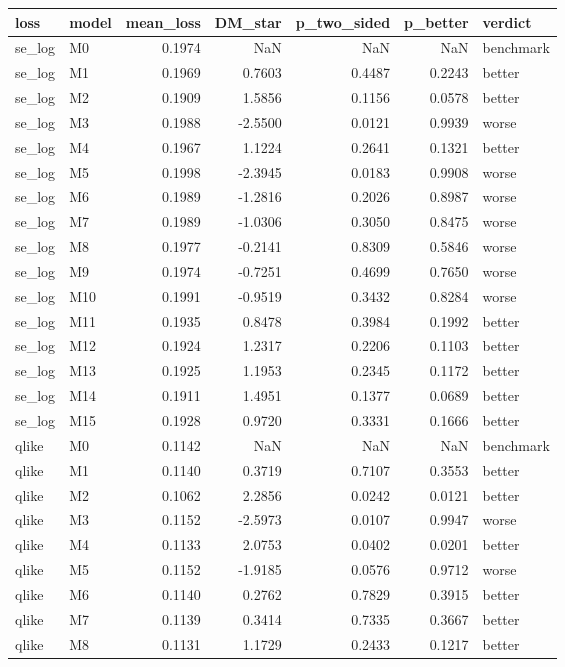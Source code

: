 \begin{tabular}{llrrrrl}
\toprule
loss & model & mean_loss & DM_star & p_two_sided & p_better & verdict \\
\midrule
se_log & M0 & 0.1974 & NaN & NaN & NaN & benchmark \\
se_log & M1 & 0.1969 & 0.7603 & 0.4487 & 0.2243 & better \\
se_log & M2 & 0.1909 & 1.5856 & 0.1156 & 0.0578 & better \\
se_log & M3 & 0.1988 & -2.5500 & 0.0121 & 0.9939 & worse \\
se_log & M4 & 0.1967 & 1.1224 & 0.2641 & 0.1321 & better \\
se_log & M5 & 0.1998 & -2.3945 & 0.0183 & 0.9908 & worse \\
se_log & M6 & 0.1989 & -1.2816 & 0.2026 & 0.8987 & worse \\
se_log & M7 & 0.1989 & -1.0306 & 0.3050 & 0.8475 & worse \\
se_log & M8 & 0.1977 & -0.2141 & 0.8309 & 0.5846 & worse \\
se_log & M9 & 0.1974 & -0.7251 & 0.4699 & 0.7650 & worse \\
se_log & M10 & 0.1991 & -0.9519 & 0.3432 & 0.8284 & worse \\
se_log & M11 & 0.1935 & 0.8478 & 0.3984 & 0.1992 & better \\
se_log & M12 & 0.1924 & 1.2317 & 0.2206 & 0.1103 & better \\
se_log & M13 & 0.1925 & 1.1953 & 0.2345 & 0.1172 & better \\
se_log & M14 & 0.1911 & 1.4951 & 0.1377 & 0.0689 & better \\
se_log & M15 & 0.1928 & 0.9720 & 0.3331 & 0.1666 & better \\
qlike & M0 & 0.1142 & NaN & NaN & NaN & benchmark \\
qlike & M1 & 0.1140 & 0.3719 & 0.7107 & 0.3553 & better \\
qlike & M2 & 0.1062 & 2.2856 & 0.0242 & 0.0121 & better \\
qlike & M3 & 0.1152 & -2.5973 & 0.0107 & 0.9947 & worse \\
qlike & M4 & 0.1133 & 2.0753 & 0.0402 & 0.0201 & better \\
qlike & M5 & 0.1152 & -1.9185 & 0.0576 & 0.9712 & worse \\
qlike & M6 & 0.1140 & 0.2762 & 0.7829 & 0.3915 & better \\
qlike & M7 & 0.1139 & 0.3414 & 0.7335 & 0.3667 & better \\
qlike & M8 & 0.1131 & 1.1729 & 0.2433 & 0.1217 & better \\

\end{tabular}
